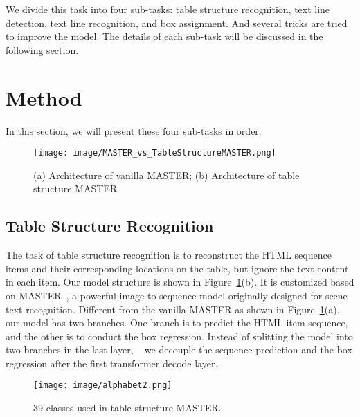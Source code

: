 \documentclass{article}
\begin{document}
We divide this task into four sub-tasks: table structure recognition, text line detection, text line recognition, and box assignment. And several tricks are tried to improve the model. The details of each sub-task will be discussed in the following section.








\section{Method}
\label{sec:headings}
In this section, we will present these four sub-tasks in order.




\begin{figure}[t] \centering
    \texttt{[image: image/MASTER\_vs\_TableStructureMASTER.png]}
    \caption{(a) Architecture of vanilla MASTER; (b) Architecture of table structure MASTER}
    \label{fig:structureR}
\end{figure}

\subsection{Table Structure Recognition}
The task of table structure recognition is to reconstruct the HTML sequence items and their corresponding locations on the table, but ignore the text content in each item. Our model structure is shown in Figure~\ref{fig:structureR}(b). It is customized based on MASTER~\cite{lu2019master}, a powerful image-to-sequence model originally designed for scene text recognition. Different from the vanilla MASTER as shown in Figure~\ref{fig:structureR}(a), our model has two branches. One branch is to predict the HTML item sequence, and the other is to conduct the box regression. Instead of splitting the model into two branches in the last layer,  
we decouple the 
sequence prediction and the box regression after the first transformer decode layer.













\begin{figure}[h] \centering
    \texttt{[image: image/alphabet2.png]}
    \caption{39 classes used in table structure MASTER. }
    \label{fig:alphabetM}
\end{figure}
\end{document}
